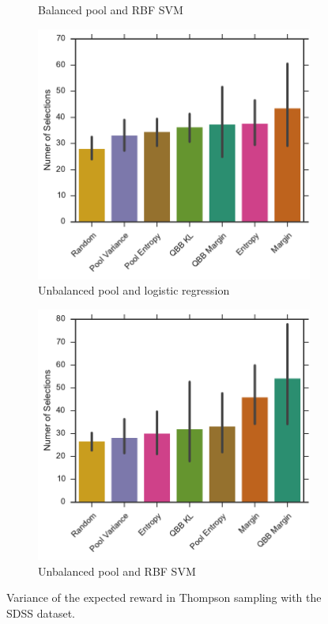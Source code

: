 \begin{figure}[p]
\begin{subfigure}{.5\textwidth}
		\caption{Balanced pool and RBF SVM}
		\label{fig:sdss_br_no_selections}
	\end{subfigure}
	\begin{subfigure}{.5\textwidth}
		\centering
		\includegraphics[width=\textwidth]{figures/5_thompson/sdss_ul_no_selections}
		\caption{Unbalanced pool and logistic regression}
		\label{fig:sdss_ul_no_selections}
	\end{subfigure}%
	\begin{subfigure}{.5\textwidth}
		\centering
		\includegraphics[width=\linewidth]{figures/5_thompson/sdss_ur_no_selections}
		\caption{Unbalanced pool and RBF SVM}
		\label{fig:sdss_ur_no_selections}
	\end{subfigure}
	\caption[Variance of heuristics (SDSS)]{
		Variance of the expected reward in Thompson sampling with the SDSS dataset.}
	\label{fig:sdss_no_selections}
\end{figure}

